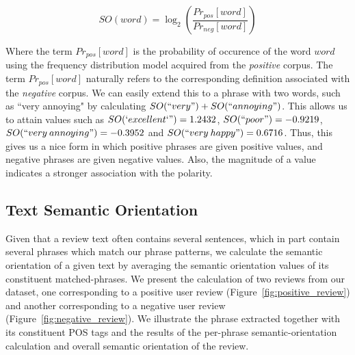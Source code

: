 \documentclass[11pt]{report} %
\begin{document}
\begin{equation*} SO(word) = \log_2 \left(\frac{Pr_{pos}[word]}{Pr_{neg}[word]}\right) \end{equation*}

Where the term $Pr_{pos}[word]$ is the probability of occurence of the word $word$ using the frequency distribution model acquired from the \textit{positive} corpus. The term $Pr_{pos}[word]$ naturally refers to the corresponding definition associated with the \textit{negative} corpus. We can easily extend this to a phrase with two words, such as ``very annoying" by calculating $SO(``very") + SO(``annoying")$. This allows us to attain values such as $SO(`excellent`")=1.2432$, $SO(``poor")=-0.9219$, $SO(``very \: annoying")=-0.3952$ and $SO(``very \: happy")=0.6716$. Thus, this gives us a nice form in which positive phrases are given positive values, and negative phrases are given negative values. Also, the magnitude of a value indicates a stronger association with the polarity.

\subsection{Text Semantic Orientation}
Given that a review text often contains several sentences, which in part contain several phrases which match our phrase patterns, we calculate the semantic orientation of a given text by averaging the semantic orientation values of its constituent matched-phrases. We present the calculation of two reviews from our dataset, one corresponding to a positive user review (Figure~\ref{fig:positive_review}) and another corresponding to a negative user review (Figure~\ref{fig:negative_review}). We illustrate the phrase extracted together with its constituent POS tags and the results of the per-phrase semantic-orientation calculation and overall semantic orientation of the review.

\pagebreak
\end{document}
